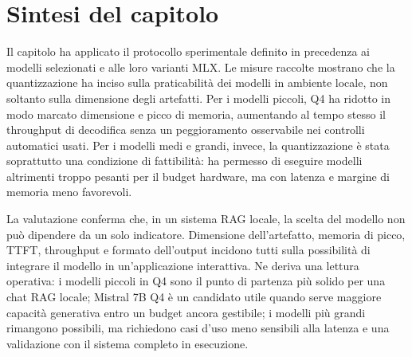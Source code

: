 \section{Sintesi del capitolo}
\label{sec:evaluation_summary}

Il capitolo ha applicato il protocollo sperimentale definito in precedenza ai
modelli selezionati e alle loro varianti MLX. Le misure raccolte mostrano che
la quantizzazione ha inciso sulla praticabilità dei modelli in ambiente locale,
non soltanto sulla dimensione degli artefatti. Per i modelli piccoli, Q4 ha
ridotto in modo marcato dimensione e picco di memoria, aumentando al tempo
stesso il throughput di decodifica senza un peggioramento osservabile nei
controlli automatici usati. Per i modelli medi e grandi, invece, la
quantizzazione è stata soprattutto una condizione di fattibilità: ha permesso
di eseguire modelli altrimenti troppo pesanti per il budget hardware, ma con
latenza e margine di memoria meno favorevoli.

La valutazione conferma che, in un sistema RAG locale, la scelta del modello non
può dipendere da un solo indicatore. Dimensione dell'artefatto, memoria di
picco, TTFT, throughput e formato dell'output incidono tutti sulla possibilità
di integrare il modello in un'applicazione interattiva. Ne deriva una lettura
operativa: i modelli piccoli in Q4 sono il punto di partenza più solido per una
chat RAG locale; Mistral 7B Q4 è un candidato utile quando serve maggiore
capacità generativa entro un budget ancora gestibile; i modelli più grandi
rimangono possibili, ma richiedono casi d'uso meno sensibili alla latenza e una
validazione con il sistema completo in esecuzione.
